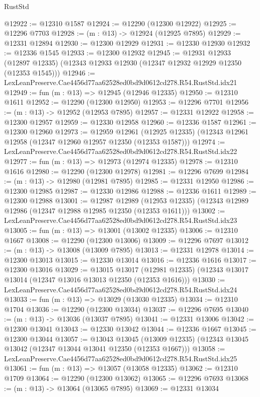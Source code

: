 \begin{lexlean}{RustStd}
\begin{coremodule}
@12922 := @12310 @1587
@12924 := @12290 (@12300 @12922)
@12925 := @12296 @7703
@12928 := (m : @13) -> @12924 (@12925 @7895)
@12929 := @12331 @12894
@12930 := @12300 @12929
@12931 := @12330 @12930
@12932 := @12336 @1545
@12933 := @12300 @12932
@12945 := @12931
    @12933
    (@12897 @12335)
    (@12343 @12933 @12930 (@12347 @12932 @12929 @12350 (@12353 @1545)))
@12946 := LexLeanPreserve.Cae4456d77aa62528ed0bd9d0612cd278.R54.RustStd.idx21
@12949 := fun (m : @13) => @12945 (@12946 @12335)
@12950 := @12310 @1611
@12952 := @12290 (@12300 @12950)
@12953 := @12296 @7701
@12956 := (m : @13) -> @12952 (@12953 @7895)
@12957 := @12331 @12922
@12958 := @12300 @12957
@12959 := @12330 @12958
@12960 := @12336 @1587
@12961 := @12300 @12960
@12973 := @12959
    @12961
    (@12925 @12335)
    (@12343 @12961 @12958 (@12347 @12960 @12957 @12350 (@12353 @1587)))
@12974 := LexLeanPreserve.Cae4456d77aa62528ed0bd9d0612cd278.R54.RustStd.idx22
@12977 := fun (m : @13) => @12973 (@12974 @12335)
@12978 := @12310 @1616
@12980 := @12290 (@12300 @12978)
@12981 := @12296 @7699
@12984 := (m : @13) -> @12980 (@12981 @7895)
@12985 := @12331 @12950
@12986 := @12300 @12985
@12987 := @12330 @12986
@12988 := @12336 @1611
@12989 := @12300 @12988
@13001 := @12987
    @12989
    (@12953 @12335)
    (@12343 @12989 @12986 (@12347 @12988 @12985 @12350 (@12353 @1611)))
@13002 := LexLeanPreserve.Cae4456d77aa62528ed0bd9d0612cd278.R54.RustStd.idx23
@13005 := fun (m : @13) => @13001 (@13002 @12335)
@13006 := @12310 @1667
@13008 := @12290 (@12300 @13006)
@13009 := @12296 @7697
@13012 := (m : @13) -> @13008 (@13009 @7895)
@13013 := @12331 @12978
@13014 := @12300 @13013
@13015 := @12330 @13014
@13016 := @12336 @1616
@13017 := @12300 @13016
@13029 := @13015
    @13017
    (@12981 @12335)
    (@12343 @13017 @13014 (@12347 @13016 @13013 @12350 (@12353 @1616)))
@13030 := LexLeanPreserve.Cae4456d77aa62528ed0bd9d0612cd278.R54.RustStd.idx24
@13033 := fun (m : @13) => @13029 (@13030 @12335)
@13034 := @12310 @1704
@13036 := @12290 (@12300 @13034)
@13037 := @12296 @7695
@13040 := (m : @13) -> @13036 (@13037 @7895)
@13041 := @12331 @13006
@13042 := @12300 @13041
@13043 := @12330 @13042
@13044 := @12336 @1667
@13045 := @12300 @13044
@13057 := @13043
    @13045
    (@13009 @12335)
    (@12343 @13045 @13042 (@12347 @13044 @13041 @12350 (@12353 @1667)))
@13058 := LexLeanPreserve.Cae4456d77aa62528ed0bd9d0612cd278.R54.RustStd.idx25
@13061 := fun (m : @13) => @13057 (@13058 @12335)
@13062 := @12310 @1709
@13064 := @12290 (@12300 @13062)
@13065 := @12296 @7693
@13068 := (m : @13) -> @13064 (@13065 @7895)
@13069 := @12331 @13034

\end{coremodule}
\end{lexlean}
